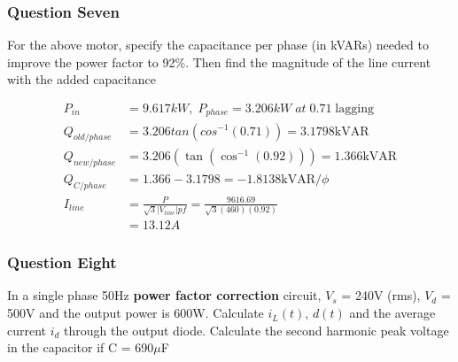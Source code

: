 \documentclass[a4paper,11pt]{article}
\begin{document}
\newpage
\subsubsection*{Question Seven}
For the above motor, specify the capacitance per phase (in kVARs) needed to improve the power factor to 92\%. Then find the magnitude of the line current with the added capacitance

\begin{align*}
    P_{in} &= 9.617kW,\; P_{phase}=3.206kW\;at\;0.71\;\mathrm{lagging}\\
    Q_{old/phase} &= 3.206tan(cos^{-1}(0.71)) = 3.1798 \mathrm{kVAR} \\
    Q_{new/phase} &= 3.206\left(\tan\left(\cos^{-1}\left(0.92\right)\right)\right) = 1.366 \mathrm{kVAR} \\
    Q_{C/phase} &= 1.366 - 3.1798=-1.8138 \mathrm{kVAR}/\phi \\
    I_{line} &= \frac{P}{\sqrt{3}|V_{line}|pf} = \frac{9616.69}{\sqrt{3}(460)(0.92)}\\
              &= 13.12 A
\end{align*}

\subsubsection*{Question Eight}
In a single phase 50Hz \textbf{power factor correction} circuit, $V_s$ = 240V (rms), $V_d$ = 500V and the output power is 600W. Calculate $i_L(t)$, $d(t)$ and the average current $i_d$ through the output diode. Calculate the second harmonic peak voltage in the capacitor if C = 690$\mu$F
\end{document}
